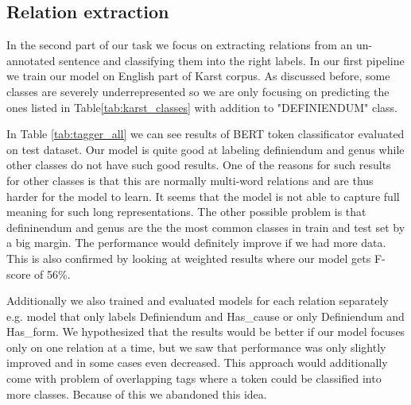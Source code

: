 \documentclass[fleqn,moreauthors,10pt]{ds_report}
\begin{document}
\subsection{Relation extraction}
\par In the second part of our task we focus on extracting relations from an un-annotated sentence and classifying them into the right labels. In our first pipeline we train our model on English part of Karst corpus. As discussed before, some classes are severely underrepresented so we are only focusing on predicting the ones listed in Table\ref{tab:karst_classes} with addition to "DEFINIENDUM" class. 
\par In Table \ref{tab:tagger_all} we can see results of BERT token classificator evaluated on test dataset. Our model is quite good at labeling definiendum and genus while other classes do not have such good results. One of the reasons for such results for other classes is that this are normally multi-word relations and are thus harder for the model to learn. It seems that the model is not able to capture full meaning for such long representations. The other possible problem is that defininendum and genus are the the most common classes in train and test set by a big margin. The performance would definitely improve if we had more data. This is also confirmed by looking at weighted results where our model gets F-score of 56\%.
\par Additionally we also trained and evaluated models for each relation separately e.g. model that only labels Definiendum and Has\_cause or only Definiendum and Has\_form. We hypothesized that the results would be better if our model focuses only on one relation at a time, but we saw that performance was only slightly improved and in some cases even decreased. This approach would additionally come with problem of overlapping tags where a token could be classified into more classes. Because of this we abandoned this idea.
\end{document}
